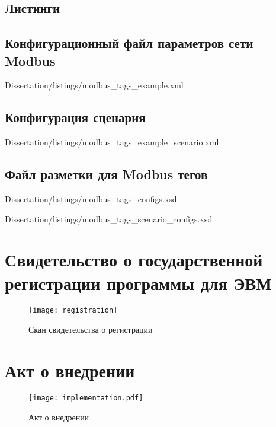 \begin{landscape}
\chapter{Листинги}
\section{Конфигурационный файл параметров сети Modbus}\label{app:sec:modbus_tag}
    
            {Dissertation/listings/modbus_tags_example.xml}
\end{landscape}

\section{Конфигурация сценария}\label{app:sec:modbus_scenario_example_diagram}

        {Dissertation/listings/modbus_tags_example_scenario.xml}

\section{Файл разметки для Modbus тегов}


        {Dissertation/listings/modbus_tags_configs.xsd}


        {Dissertation/listings/modbus_tags_scenario_configs.xsd}



\chapter{Свидетельство о государственной регистрации программы для ЭВМ}\label{ch:app1}
\begin{center}
    \begin{figure}[hb]
        \texttt{[image: registration]}
        \caption{Скан свидетельства о регистрации}\label{app:fig:registration}
    \end{figure}
\end{center}



\chapter{Акт о внедрении}\label{ch:app2}
\begin{center}
    \begin{figure}[hb]
        \texttt{[image: implementation.pdf]}
        \caption{Акт о внедрении}\label{app:fig:implementation}
    \end{figure}
\end{center}
